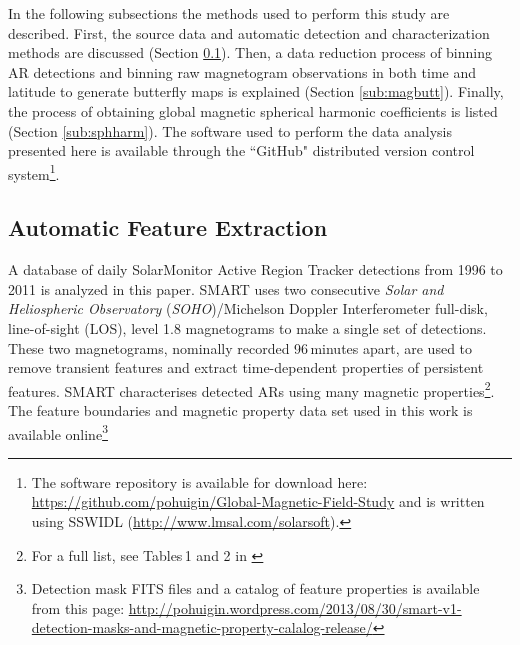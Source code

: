 \documentclass[namedreferences]{solarphysics}
\begin{document}
\begin{article}
In the following subsections the methods used to perform this study are described. First, the source data and automatic detection and characterization methods are discussed (Section \ref{sub:autofeat}). Then, a data reduction process of binning AR detections and binning raw magnetogram observations in both time and latitude to generate butterfly maps is explained (Section \ref{sub:magbutt}). Finally, the process of obtaining global magnetic spherical harmonic coefficients is listed (Section \ref{sub:sphharm}). The software used to perform the data analysis presented here is available through the ``GitHub" distributed version control system\footnote{The software repository is available for download here: \url{https://github.com/pohuigin/Global-Magnetic-Field-Study} and is written using SSWIDL (\url{http://www.lmsal.com/solarsoft}).}.


\subsection{Automatic Feature Extraction}\label{sub:autofeat}

A database of daily SolarMonitor Active Region Tracker \citep[SMART;][]{higgins:2011} detections from 1996 to 2011 is analyzed in this paper. SMART uses two consecutive \emph{Solar and Heliospheric Observatory} (\emph{SOHO})/Michelson Doppler Interferometer \citep[MDI;][]{Scherrer:1995} full-disk, line-of-sight (LOS), level 1.8 magnetograms to make a single set of detections. These two magnetograms, nominally recorded 96\,minutes apart, are used to remove transient features and extract time-dependent properties of persistent features. SMART characterises detected ARs using many magnetic properties\footnote{For a full list, see Tables\,1 and 2 in \cite{higgins:2011}}. The feature boundaries and magnetic property data set used in this work is available online\footnote{Detection mask FITS files and a catalog of feature properties is available from this page: \url{http://pohuigin.wordpress.com/2013/08/30/smart-v1-detection-masks-and-magnetic-property-calalog-release/}}


\end{article}
\end{document}
